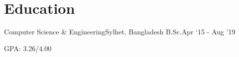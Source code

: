 


\section{\textbf{Education}}
\vspace{-0.4mm}
\resumeSubHeadingListStart

\resumeSubheading
{Computer Science \& Engineering}{Sylhet, Bangladesh}
{B.Sc.}{Apr `15 - Aug '19}
\resumeItemListStart
\item GPA: 3.26/4.00
\resumeItemListEnd



\resumeSubHeadingListEnd
\vspace{-6mm}
